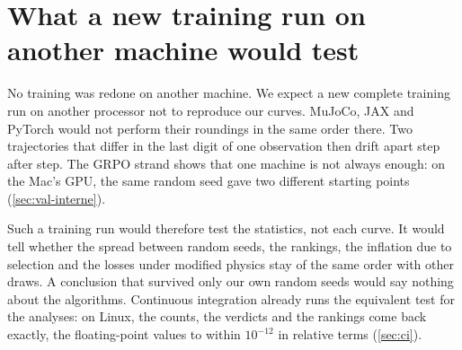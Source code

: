 \section{What a new training run on another machine would test}
\label{sec:reentrainer}

No training was redone on another machine. We expect a new complete training run on another
processor not to reproduce our curves. MuJoCo, JAX and PyTorch would not perform their roundings in
the same order there. Two trajectories that differ in the last digit of one observation then drift
apart step after step. The GRPO strand shows that one machine is not always enough: on the Mac's
GPU, the same random seed gave two different starting points (\cref{sec:val-interne}).

Such a training run would therefore test the statistics, not each curve. It would tell whether the
spread between random seeds, the rankings, the inflation due to selection and the losses under
modified physics stay of the same order with other draws. A conclusion that survived only our own
random seeds would say nothing about the algorithms. Continuous integration already runs the
equivalent test for the analyses: on Linux, the counts, the verdicts and the rankings come back
exactly, the floating-point values to within $10^{-12}$ in relative terms (\cref{sec:ci}).

